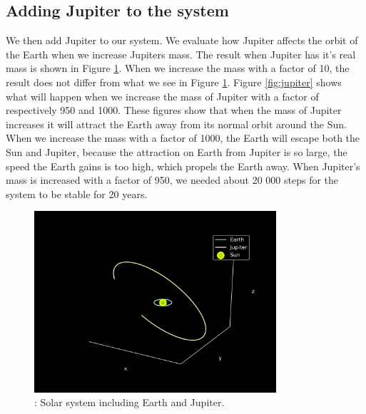 \documentclass{article}
\begin{document}
    \subsection{Adding Jupiter to the system}
        We then add Jupiter to our system. We evaluate how Jupiter affects the orbit of the Earth when we increase Jupiters mass. The result when Jupiter has it's real mass is shown in Figure \ref{fig:jupiter1}. When we increase the mass with a factor of 10, the result does not differ from what we see in Figure \ref{fig:jupiter1}. Figure \ref{fig:jupiter} shows what will happen when we increase the mass of Jupiter with a factor of respectively 950 and 1000. These figures show that when the mass of Jupiter increases it will attract the Earth away from its normal orbit around the Sun. When we increase the mass with a factor of 1000, the Earth will escape both the Sun and Jupiter, because the attraction on Earth from Jupiter is so large, the speed the Earth gains is too high, which propels the Earth away. When Jupiter's mass is increased with a factor of 950, we needed about 20 000 steps for the system to be stable for 20 years.

        \begin{figure}[H]
            \begin{center}
                \includegraphics[width=0.8\textwidth]{./Plot/Earth_Jupiter1.png}
                \caption{: Solar system including Earth and Jupiter.}
                \label{fig:jupiter1}
            \end{center}
        \end{figure}
\end{document}
